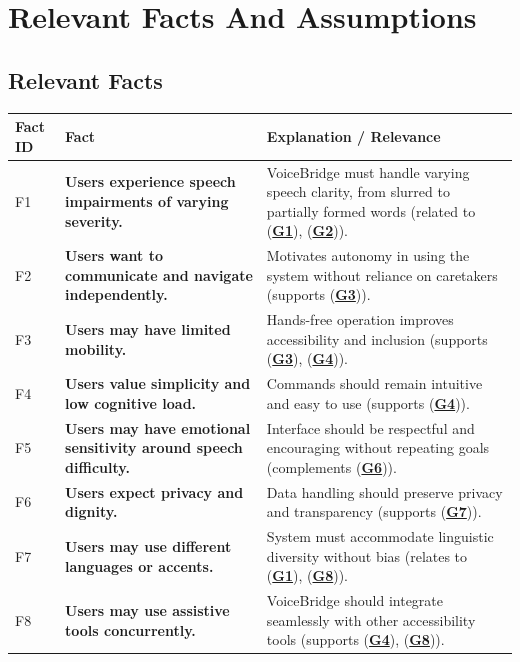 \documentclass[11pt]{article}
\begin{document}
\section{Relevant Facts And Assumptions}
\subsection{Relevant Facts}

\begin{table}[H]
\centering
\begin{tabularx}{\textwidth}{p{1cm}p{6cm}X}
\toprule {\textbf{Fact ID}} & {\textbf{Fact}} & {\textbf{Explanation / Relevance}}\\
\midrule
F1 & \textbf{Users experience speech impairments of varying severity.} & VoiceBridge must handle varying speech clarity, from slurred to partially formed words (related to (\textbf{\hyperref[tab:project-goals]{G1}}), (\textbf{\hyperref[tab:project-goals]{G2}})). \\ \hline
F2 & \textbf{Users want to communicate and navigate independently.} & Motivates autonomy in using the system without reliance on caretakers (supports (\textbf{\hyperref[tab:project-goals]{G3}})). \\ \hline
F3 & \textbf{Users may have limited mobility.} & Hands-free operation improves accessibility and inclusion (supports (\textbf{\hyperref[tab:project-goals]{G3}}), (\textbf{\hyperref[tab:project-goals]{G4}})). \\ \hline
F4 & \textbf{Users value simplicity and low cognitive load.} & Commands should remain intuitive and easy to use (supports (\textbf{\hyperref[tab:project-goals]{G4}})). \\ \hline
F5 & \textbf{Users may have emotional sensitivity around speech difficulty.} & Interface should be respectful and encouraging without repeating goals (complements (\textbf{\hyperref[tab:project-goals]{G6}})). \\ \hline
F6 & \textbf{Users expect privacy and dignity.} & Data handling should preserve privacy and transparency (supports (\textbf{\hyperref[tab:project-goals]{G7}})). \\ \hline
F7 & \textbf{Users may use different languages or accents.} & System must accommodate linguistic diversity without bias (relates to (\textbf{\hyperref[tab:project-goals]{G1}}), (\textbf{\hyperref[tab:project-goals]{G8}})). \\ \hline
F8 & \textbf{Users may use assistive tools concurrently.} & VoiceBridge should integrate seamlessly with other accessibility tools (supports (\textbf{\hyperref[tab:project-goals]{G4}}), (\textbf{\hyperref[tab:project-goals]{G8}})). \\ \hline

\end{tabularx}
\end{table}
\end{document}

